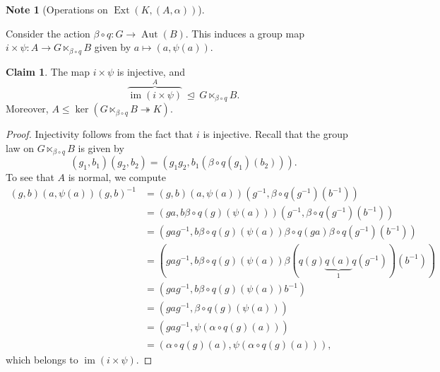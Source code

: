 \documentclass[10pt,letterpaper,cm]{nupset}
\theoremstyle{definition}
\newtheorem{note}[definition]{Note}
\theoremstyle{theorem}
\newtheorem*{claim}{Claim}
\theoremstyle{remark}
\newcommand{\1}{\mathbf{1}}
\newcommand{\0}{\vec 0}
\DeclareMathOperator{\aut}{Aut}
\DeclareMathOperator{\ext}{Ext}
\DeclareMathOperator{\im}{im}
\begin{document}
\begin{note}[Operations on $\ext(K, (A, \alpha))$]
\begin{enumerate}[label=(\arabic*)]
Consider the action $\beta \circ q : G \to \aut(B)$. This induces a group map $i \times \psi : A \to G \ltimes_{\beta \circ q} B$ given by $a \mapsto \left(a, \psi(a)\right)$.
\begin{claim}
The map $i \times \psi$ is injective, and $$\overbrace{\im(i \times \psi)}^{A} \ \unlhd \ G \ltimes_{\beta \circ q} B.$$ Moreover, $A \leq \ker(G\ltimes_{\beta \circ q} B \twoheadrightarrow K)$.
\end{claim}
\begin{proof}
Injectivity follows from the fact that $i$ is injective. Recall that the group law on $G \ltimes_{\beta \circ q} B$ is given by 
\[
\left(g_1, b_1\right)\left(g_2, b_2\right) = \left(g_1g_2, b_1(\beta \circ q(g_1)(b_2))\right).
\] 
To see that $A$ is normal, we compute
\begin{align*}
(g, b)(a, \psi(a))(g,b)^{-1} & = \left(g, b\right)(a, \psi(a) )(g^{-1}, \beta \circ q(g^{-1})(b^{-1})) 
\\ & = \left(ga, b\beta \circ q(g)(\psi(a))\right)(g^{-1}, \beta \circ q(g^{-1})(b^{-1}))
\\ &  = \left(gag^{-1}, b\beta \circ q(g)(\psi(a))\beta \circ q(ga)\beta \circ q(g^{-1})(b^{-1})\right)
\\ &  = \left(gag^{-1}, b\beta \circ q(g)(\psi(a)) \beta (q(g)\underbrace{q(a)}_{1}q(g^{-1}))(b^{-1})\right)
\\ & =  \left(gag^{-1}, b\beta \circ q(g)(\psi(a))b^{-1}\right) 
\\ & = \left(gag^{-1}, \beta \circ q(g)(\psi(a))\right)
\\ &  = \left(gag^{-1}, \psi(\alpha \circ q(g)(a))\right)
\\ &  = \left(\alpha \circ q(g)(a),  \psi(\alpha \circ q(g)(a))\right),
 \end{align*} 
which belongs to $\im(i \times \psi)$.


\end{proof}
\end{enumerate}
\end{note}
\end{document}

